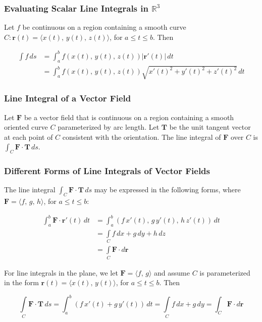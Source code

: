 \subsubsection{Evaluating Scalar Line Integrals in $\mathbb{R}^3$}
Let $f$ be continuous on a region containing a smooth curve $C: \mathbf{r}(t) = \langle x(t),\, y(t),\, z(t) \rangle$, for $a \leq t \leq b$. Then

\begin{align}
    \int f \, ds &= \int _a ^b f(x(t),\, y(t),\, z(t))|\mathbf{r}'(t)| \, dt \\
    &= \int _a ^b f(x(t),\, y(t),\, z(t))\sqrt{x'(t)^2 + y'(t)^2 + z'(t)^2} \, dt
\end{align}

\subsubsection{Line Integral of a Vector Field}
Let $\mathbf{F}$ be a vector field that is continuous on a region containing a smooth oriented curve $C$ parameterized by arc length. Let $\mathbf{T}$ be the unit tangent vector at each point of $C$ consistent with the orientation. The line integral of $\mathbf{F}$ over $C$ is $\int _C \mathbf{F \cdot T} \, ds$.

\subsubsection{Different Forms of Line Integrals of Vector Fields}
The line integral $\int _C \mathbf{F \cdot T} \, ds$ may be expressed in the following forms, where $\mathbf{F} = \langle f,\, g,\, h \rangle$, for $a \leq t \leq b$:

\begin{align}
    \int _a ^b \mathbf{F \cdot r}'(t) \, dt &= \int _a ^b (f\,x'(t),\, g\,y'(t),\, h\,z'(t)) \, dt \\
    &= \int \limits _C f \, dx + g \, dy + h \, dz \\
    &= \int \limits _C \mathbf{F} \cdot  d\mathbf{r}
\end{align}

For line integrals in the plane, we let $\mathbf{F} = \langle f,\, g \rangle$ and assume $C$ is parameterized in the form $\mathbf{r}(t) = \langle x(t),\, y(t) \rangle$, for $a \leq t \leq b$. Then

\begin{equation}
    \int \limits _C \mathbf{F \cdot T} \, ds = \int _a ^b (f \, x'(t) + g \, y'(t)) \, dt = \int \limits _C f \, dx + g \, dy = \int _C \mathbf{F} \cdot d\mathbf{r}
\end{equation}

